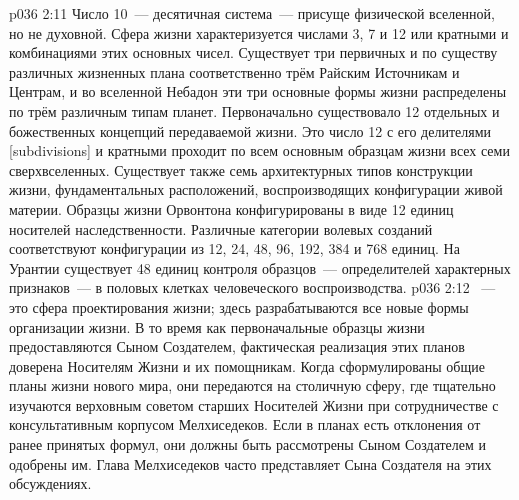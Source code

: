 \vs p036 2:11 Число 10~--- десятичная система~--- присуще физической вселенной, но не духовной. Сфера жизни характеризуется числами 3, 7 и 12 или кратными и комбинациями этих основных чисел. Существует три первичных и по существу различных жизненных плана соответственно трём Райским Источникам и Центрам, и во вселенной Небадон эти три основные формы жизни распределены по трём различным типам планет. Первоначально существовало 12 отдельных и божественных концепций передаваемой жизни. Это число 12 с его делителями [subdivisions] и кратными проходит по всем основным образцам жизни всех семи сверхвселенных. Существует также семь архитектурных типов конструкции жизни, фундаментальных расположений, воспроизводящих конфигурации живой материи. Образцы жизни Орвонтона конфигурированы в виде 12 единиц носителей наследственности. Различные категории волевых созданий соответствуют конфигурации из 12, 24, 48, 96, 192, 384 и 768 единиц. На Урантии существует 48 единиц контроля образцов~--- определителей характерных признаков~--- в половых клетках человеческого воспроизводства.
\vs p036 2:12 \pc {}~--- это сфера проектирования жизни; здесь разрабатываются все новые формы организации жизни. В то время как первоначальные образцы жизни предоставляются Сыном Создателем, фактическая реализация этих планов доверена Носителям Жизни и их помощникам. Когда сформулированы общие планы жизни нового мира, они передаются на столичную сферу, где тщательно изучаются верховным советом старших Носителей Жизни при сотрудничестве с консультативным корпусом Мелхиседеков. Если в планах есть отклонения от ранее принятых формул, они должны быть рассмотрены Сыном Создателем и одобрены им. Глава Мелхиседеков часто представляет Сына Создателя на этих обсуждениях.
